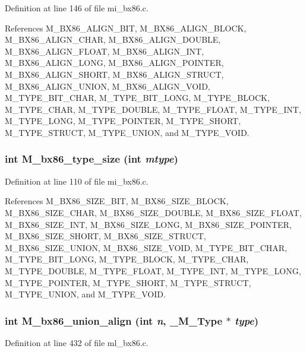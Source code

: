 Definition at line 146 of file mi\_\-bx86.c.

References M\_\-BX86\_\-ALIGN\_\-BIT, M\_\-BX86\_\-ALIGN\_\-BLOCK, M\_\-BX86\_\-ALIGN\_\-CHAR, M\_\-BX86\_\-ALIGN\_\-DOUBLE, M\_\-BX86\_\-ALIGN\_\-FLOAT, M\_\-BX86\_\-ALIGN\_\-INT, M\_\-BX86\_\-ALIGN\_\-LONG, M\_\-BX86\_\-ALIGN\_\-POINTER, M\_\-BX86\_\-ALIGN\_\-SHORT, M\_\-BX86\_\-ALIGN\_\-STRUCT, M\_\-BX86\_\-ALIGN\_\-UNION, M\_\-BX86\_\-ALIGN\_\-VOID, M\_\-TYPE\_\-BIT\_\-CHAR, M\_\-TYPE\_\-BIT\_\-LONG, M\_\-TYPE\_\-BLOCK, M\_\-TYPE\_\-CHAR, M\_\-TYPE\_\-DOUBLE, M\_\-TYPE\_\-FLOAT, M\_\-TYPE\_\-INT, M\_\-TYPE\_\-LONG, M\_\-TYPE\_\-POINTER, M\_\-TYPE\_\-SHORT, M\_\-TYPE\_\-STRUCT, M\_\-TYPE\_\-UNION, and M\_\-TYPE\_\-VOID.
\subsubsection{\setlength{\rightskip}{0pt plus 5cm}int M\_\-bx86\_\-type\_\-size (int {\em mtype})}\label{m__bx86_8h_345cff019da2f33d628513a7b5c0115f}




Definition at line 110 of file mi\_\-bx86.c.

References M\_\-BX86\_\-SIZE\_\-BIT, M\_\-BX86\_\-SIZE\_\-BLOCK, M\_\-BX86\_\-SIZE\_\-CHAR, M\_\-BX86\_\-SIZE\_\-DOUBLE, M\_\-BX86\_\-SIZE\_\-FLOAT, M\_\-BX86\_\-SIZE\_\-INT, M\_\-BX86\_\-SIZE\_\-LONG, M\_\-BX86\_\-SIZE\_\-POINTER, M\_\-BX86\_\-SIZE\_\-SHORT, M\_\-BX86\_\-SIZE\_\-STRUCT, M\_\-BX86\_\-SIZE\_\-UNION, M\_\-BX86\_\-SIZE\_\-VOID, M\_\-TYPE\_\-BIT\_\-CHAR, M\_\-TYPE\_\-BIT\_\-LONG, M\_\-TYPE\_\-BLOCK, M\_\-TYPE\_\-CHAR, M\_\-TYPE\_\-DOUBLE, M\_\-TYPE\_\-FLOAT, M\_\-TYPE\_\-INT, M\_\-TYPE\_\-LONG, M\_\-TYPE\_\-POINTER, M\_\-TYPE\_\-SHORT, M\_\-TYPE\_\-STRUCT, M\_\-TYPE\_\-UNION, and M\_\-TYPE\_\-VOID.
\subsubsection{\setlength{\rightskip}{0pt plus 5cm}int M\_\-bx86\_\-union\_\-align (int {\em n}, \bf{\_\-M\_\-Type} $\ast$ {\em type})}\label{m__bx86_8h_b064c822a6369d1368f976c10c979b18}




Definition at line 432 of file ml\_\-bx86.c.

